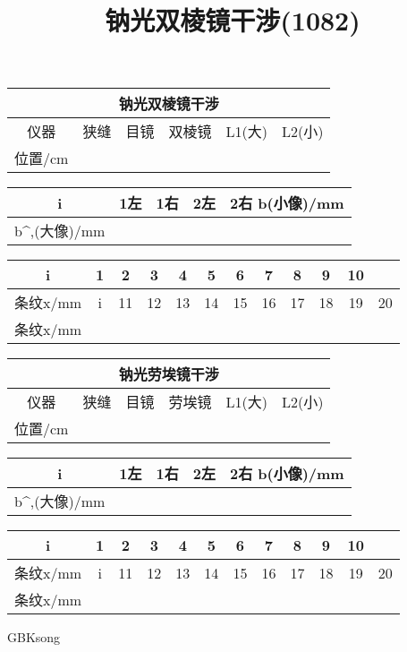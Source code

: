 \documentclass{article}
\title{钠光双棱镜干涉(1082)}
\begin{document}
\begin{CJK}{GBK}{song}

\maketitle

\begin{tabular}{|c|c|c|c|c|c|}
\hline
\multicolumn{6}{|c|}{钠光双棱镜干涉}\\
\hline
仪器&狭缝&目镜&双棱镜&L1(大)&L2(小)\\
\hline
位置/cm&
\end{tabular}

\begin{tabular}{|c|c|c|c|c|}
\hline
i&1左&1右&2左&2右
\hline
b(小像)/mm&\\
\hline
b^,(大像)/mm&\\
\end{tabular}

\begin{tabular}{|c|c|c|c|c|c|c|c|c|c|c|}
\hline
i&1&2&3&4&5&6&7&8&9&10\\
\hline
条纹x/mm&
\hline
i&11&12&13&14&15&16&17&18&19&20\\
\hline
条纹x/mm&
\hline
\end{tabular}

\begin{tabular}{|c|c|c|c|c|c|}
\hline
\multicolumn{6}{|c|}{钠光劳埃镜干涉}\\
\hline
仪器&狭缝&目镜&劳埃镜&L1(大)&L2(小)\\
\hline
位置/cm&
\end{tabular}

\begin{tabular}{|c|c|c|c|c|}
\hline
i&1左&1右&2左&2右
\hline
b(小像)/mm&\\
\hline
b^,(大像)/mm&\\
\end{tabular}

\begin{tabular}{|c|c|c|c|c|c|c|c|c|c|c|}
\hline
i&1&2&3&4&5&6&7&8&9&10\\
\hline
条纹x/mm&
\hline
i&11&12&13&14&15&16&17&18&19&20\\
\hline
条纹x/mm&
\hline
\end{tabular}


\end{CJK}{GBK}{song}
\end{document}
